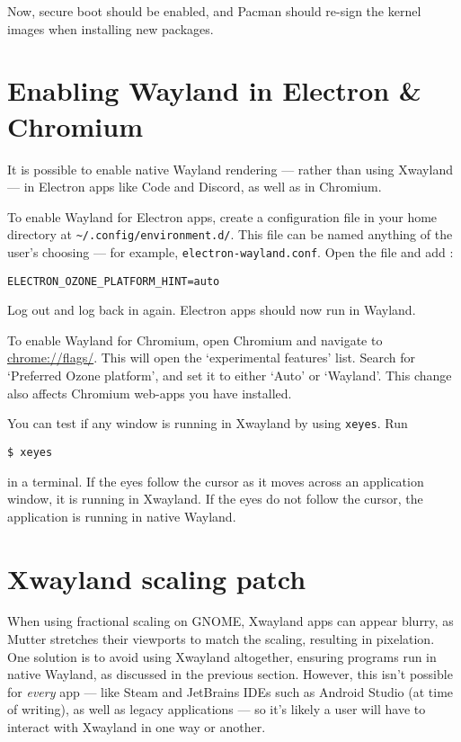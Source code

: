 \documentclass[a4paper]{article}
\begin{document}
Now, secure boot should be enabled, and Pacman should re-sign the kernel images when installing new packages.

\section{Enabling Wayland in Electron \& Chromium}

It is possible to enable native Wayland rendering --- rather than using Xwayland --- in Electron apps like Code and Discord, as well as in Chromium.

To enable Wayland for Electron apps, create a configuration file in your home directory at \lstinline|~/.config/environment.d/|.
This file can be named anything of the user's choosing --- for example, \lstinline|electron-wayland.conf|.
Open the file and add \cite{arch-wiki-wayland}:
\begin{lstlisting}
ELECTRON_OZONE_PLATFORM_HINT=auto
\end{lstlisting}
Log out and log back in again.
Electron apps should now run in Wayland.

To enable Wayland for Chromium, open Chromium and navigate to \url{chrome://flags/}.
This will open the `experimental features' list.
Search for `Preferred Ozone platform', and set it to either `Auto' or `Wayland'.
This change also affects Chromium web-apps you have installed.

You can test if any window is running in Xwayland by using \lstinline|xeyes|.
Run
\begin{lstlisting}
$ xeyes
\end{lstlisting}
in a terminal.
If the eyes follow the cursor as it moves across an application window, it is running in Xwayland.
If the eyes do not follow the cursor, the application is running in native Wayland.

\section{Xwayland scaling patch}

When using fractional scaling on GNOME, Xwayland apps can appear blurry, as Mutter stretches their viewports to match the scaling, resulting in pixelation.
One solution is to avoid using Xwayland altogether, ensuring programs run in native Wayland, as discussed in the previous section.
However, this isn't possible for \emph{every} app --- like Steam and JetBrains IDEs such as Android Studio (at time of writing), as well as legacy applications --- so it's likely a user will have to interact with Xwayland in one way or another.
\end{document}
